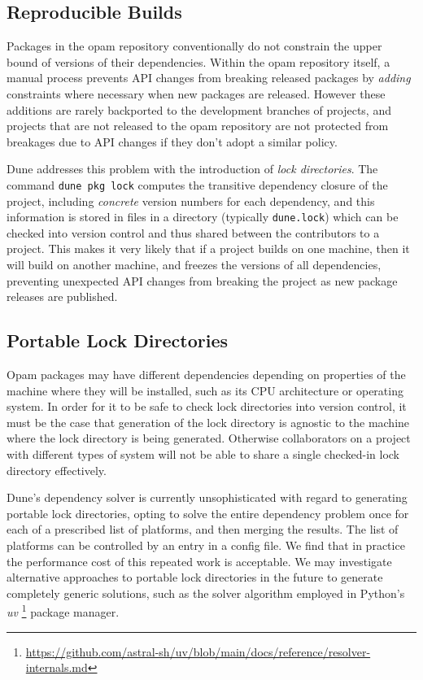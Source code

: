 \documentclass{article}
\begin{document}
\begin{multicols}{2}
        \section {Reproducible Builds}

        Packages in the opam repository conventionally do not constrain the
        upper bound of versions of their dependencies. Within the opam
        repository itself, a manual process prevents API changes from breaking
        released packages by \textit{adding} constraints where necessary when
        new packages are released. However these additions are rarely
        backported to the development branches of projects, and projects that
        are not released to the opam repository are not protected from
        breakages due to API changes if they don't adopt a similar policy.

        Dune addresses this problem with the introduction of \textit{lock
        directories}. The command \texttt{dune pkg lock} computes the transitive
        dependency closure of the project, including \textit{concrete} version
        numbers for each dependency, and this information is stored in files in
        a directory (typically \texttt{dune.lock}) which can be checked into
        version control and thus shared between the contributors to a project.
        This makes it very likely that if a project builds on one machine, then
        it will build on another machine, and freezes the versions of all
        dependencies, preventing unexpected API changes from breaking the
        project as new package releases are published.

        \subsection {Portable Lock Directories}

        Opam packages may have different dependencies depending on properties of
        the machine where they will be installed, such as its CPU architecture
        or operating system. In order for it to be safe to check lock
        directories into version control, it must be the case that generation of
        the lock directory is agnostic to the machine where the lock directory
        is being generated. Otherwise collaborators on a project with different
        types of system will not be able to share a single checked-in lock
        directory effectively.

        Dune's dependency solver is currently unsophisticated with regard to
        generating portable lock directories, opting to solve the entire
        dependency problem once for each of a prescribed list of platforms, and
        then merging the results. The list of platforms can be controlled by an
        entry in a config file. We find that in practice the performance cost of
        this repeated work is acceptable. We may investigate alternative
        approaches to portable lock directories in the future to
        generate completely generic solutions, such as the solver algorithm
        employed in Python's \textit{uv}
        \footnote{\url{https://github.com/astral-sh/uv/blob/main/docs/reference/resolver-internals.md}}
        package manager.


\end{multicols}
\end{document}
